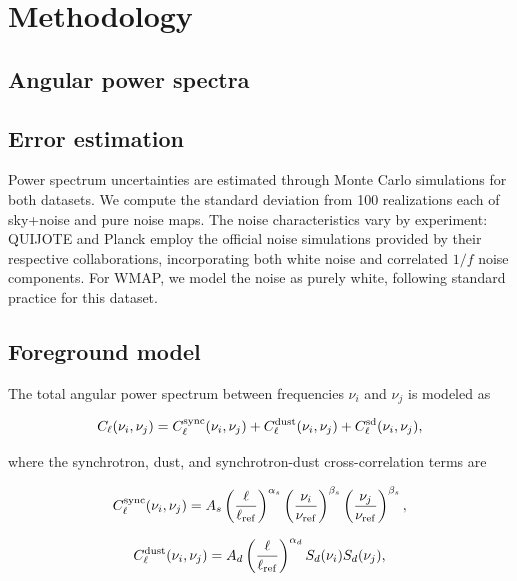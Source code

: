 \section{Methodology}
\label{sec:methodology}

\subsection{Angular power spectra}
\label{sec:aps}

\subsection{Error estimation}
\label{sec:error}

Power spectrum uncertainties are estimated through Monte Carlo simulations for both datasets. We compute the standard deviation from 100 realizations each of sky+noise and pure noise maps. The noise characteristics vary by experiment: QUIJOTE and Planck employ the official noise simulations provided by their respective collaborations, incorporating both white noise and correlated $1/f$ noise components. For WMAP, we model the noise as purely white, following standard practice for this dataset.


\subsection{Foreground model}
\label{sec:foreground_model}


The total angular power spectrum between frequencies $\nu_i$ and $\nu_j$ is modeled as

\begin{equation}
C_\ell(\nu_i, \nu_j) = C_\ell^{\rm sync}(\nu_i, \nu_j) + C_\ell^{\rm dust}(\nu_i, \nu_j) + C_\ell^{\rm sd}(\nu_i, \nu_j),
\end{equation}

where the synchrotron, dust, and synchrotron-dust cross-correlation terms are

\begin{equation}
C_\ell^{\rm sync}(\nu_i, \nu_j) = A_s \left(\frac{\ell}{\ell_{\rm ref}}\right)^{\alpha_s} 
\left(\frac{\nu_i}{\nu_{\rm ref}}\right)^{\beta_s} \left(\frac{\nu_j}{\nu_{\rm ref}}\right)^{\beta_s},
\end{equation}

\begin{equation}
C_\ell^{\rm dust}(\nu_i, \nu_j) = A_d \left(\frac{\ell}{\ell_{\rm ref}}\right)^{\alpha_d} 
S_d(\nu_i) S_d(\nu_j),
\end{equation}

